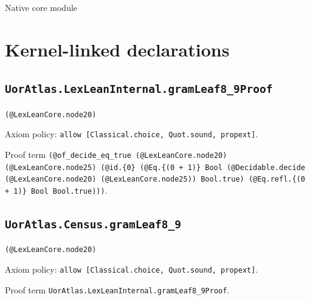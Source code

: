 \documentclass[11pt]{article}
\begin{document}
\begin{center}{\LARGE Native core module}\end{center}
\section*{Kernel-linked declarations}
\subsection*{\texttt{UorAtlas.LexLeanInternal.gramLeaf8\_9Proof}}
\noindent\texttt{(@LexLeanCore.node20)}\par
\noindent Axiom policy: \texttt{allow [Classical.choice, Quot.sound, propext]}.\par
\noindent Proof term \texttt{(@of\_decide\_eq\_true (@LexLeanCore.node20) (@LexLeanCore.node25) (@id.\{0\} (@Eq.\{(0 + 1)\} Bool (@Decidable.decide (@LexLeanCore.node20) (@LexLeanCore.node25)) Bool.true) (@Eq.refl.\{(0 + 1)\} Bool Bool.true)))}.\par
\subsection*{\texttt{UorAtlas.Census.gramLeaf8\_9}}
\noindent\texttt{(@LexLeanCore.node20)}\par
\noindent Axiom policy: \texttt{allow [Classical.choice, Quot.sound, propext]}.\par
\noindent Proof term \texttt{UorAtlas.LexLeanInternal.gramLeaf8\_9Proof}.\par
\end{document}
